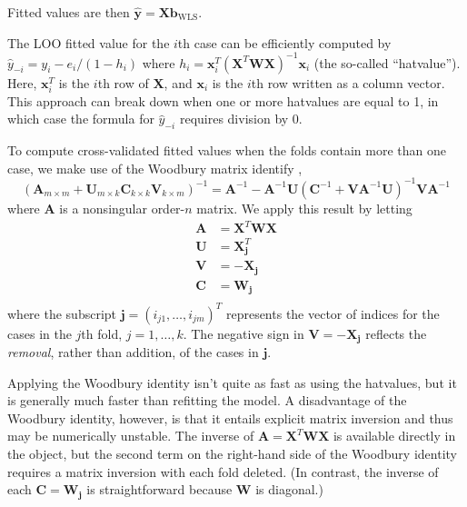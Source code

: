 \documentclass[
]{jss}
\begin{document}
Fitted values are then
\(\widehat{\mathbf{y}} = \mathbf{X}\mathbf{b}_{\mathrm{WLS}}\).

The LOO fitted value for the \(i\)th case can be efficiently computed by
\(\widehat{y}_{-i} = y_i - e_i/(1 - h_i)\) where
\(h_i = \mathbf{x}^T_i \left( \mathbf{X}^T \mathbf{W} \mathbf{X} \right)^{-1} \mathbf{x}_i\)
(the so-called ``hatvalue''). Here, \(\mathbf{x}^T_i\) is the \(i\)th
row of \(\mathbf{X}\), and \(\mathbf{x}_i\) is the \(i\)th row written
as a column vector. This approach can break down when one or more
hatvalues are equal to 1, in which case the formula for
\(\widehat{y}_{-i}\) requires division by 0.

To compute cross-validated fitted values when the folds contain more
than one case, we make use of the Woodbury matrix identify
\citep{Wikipedia-Woodbury:2023}, \[
\left(\mathbf{A}_{m \times m} + \mathbf{U}_{m \times k} 
\mathbf{C}_{k \times k} \mathbf{V}_{k \times m} \right)^{-1} = \mathbf{A}^{-1} - \mathbf{A}^{-1}\mathbf{U} \left(\mathbf{C}^{-1} + 
\mathbf{VA}^{-1}\mathbf{U} \right)^{-1} \mathbf{VA}^{-1}
\] where \(\mathbf{A}\) is a nonsingular order-\(n\) matrix. We apply
this result by letting \begin{align*}
    \mathbf{A} &= \mathbf{X}^T \mathbf{W} \mathbf{X} \\
    \mathbf{U} &= \mathbf{X}_\mathbf{j}^T \\
    \mathbf{V} &= - \mathbf{X}_\mathbf{j} \\
    \mathbf{C} &= \mathbf{W}_\mathbf{j} \\
\end{align*} where the subscript
\(\mathbf{j} = (i_{j1}, \ldots, i_{jm})^T\) represents the vector of
indices for the cases in the \(j\)th fold, \(j = 1, \ldots, k\). The
negative sign in \(\mathbf{V} = - \mathbf{X}_\mathbf{j}\) reflects the
\emph{removal}, rather than addition, of the cases in \(\mathbf{j}\).

Applying the Woodbury identity isn't quite as fast as using the
hatvalues, but it is generally much faster than refitting the model. A
disadvantage of the Woodbury identity, however, is that it entails
explicit matrix inversion and thus may be numerically unstable. The
inverse of \(\mathbf{A} = \mathbf{X}^T \mathbf{W} \mathbf{X}\) is
available directly in the  object, but the second term on the
right-hand side of the Woodbury identity requires a matrix inversion
with each fold deleted. (In contrast, the inverse of each
\(\mathbf{C} = \mathbf{W}_\mathbf{j}\) is straightforward because
\(\mathbf{W}\) is diagonal.)
\end{document}
